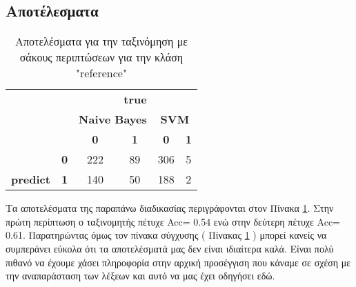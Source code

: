 \subsection{Αποτέλεσματα}




\begin{table}[]
	\centering
	\caption{Αποτελέσματα για την ταξινόμηση με σάκους περιπτώσεων για την κλάση "reference"}
	\label{tab: bags of instances}
	\begin{tabular}{|c|c|c|c|c|c|}
		\hline
		\multicolumn{2}{|c|}{{\color[HTML]{343434} }}                   & \multicolumn{4}{c|}{\textbf{true}}                                            \\ \cline{3-6} 
		\multicolumn{2}{|c|}{{\color[HTML]{343434} }}                   & \multicolumn{2}{c|}{\textbf{Naive Bayes}} & \multicolumn{2}{c|}{\textbf{SVM}} \\ \cline{3-6} 
		\multicolumn{2}{|c|}{\multirow{-3}{*}{{\color[HTML]{343434} }}} & \textbf{0}          & \textbf{1}          & \textbf{0}      & \textbf{1}      \\ \hline
		& \textbf{0}         & 222                 & 89                  & 306             & 5               \\ \cline{2-6} 
		\multirow{-2}{*}{\textbf{predict}}         & \textbf{1}         & 140                 & 50                  & 188             & 2               \\ \hline
	\end{tabular}
\end{table}


Τα αποτελέσματα της παραπάνω διαδικασίας περιγράφονται στον Πίνακα \ref{tab: bags of instances}. Στην πρώτη περίπτωση ο ταξινομητής πέτυχε Acc= 0.54 ενώ στην δεύτερη πέτυχε Acc= 0.61. Παρατηρώντας όμως τον πίνακα σύγχυσης ( Πίνακας \ref{tab: bags of instances} ) μπορεί κανείς να συμπεράνει εύκολα ότι τα αποτελέσματά μας δεν είναι ιδιαίτερα καλά. Είναι πολύ πιθανό να έχουμε χάσει πληροφορία στην αρχική προσέγγιση που κάναμε σε σχέση με την αναπαράσταση των λέξεων και αυτό να μας έχει οδηγήσει εδώ.

\newpage
